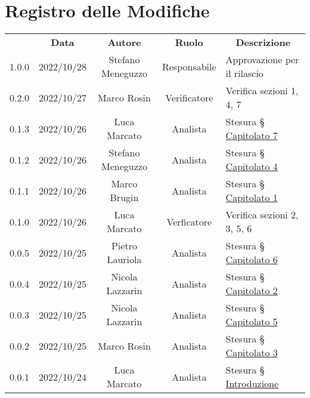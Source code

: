 \thispagestyle{empty}

\section*{Registro delle Modifiche}

\begin{center}
    \renewcommand{\arraystretch}{1.8}
    \begin{longtable}[c]{c | c | c | c | p{5cm}}
        \rowcolor[HTML]{444444}
        \multicolumn{1}{c}{\color[HTML]{FFFFFF} \textbf{Versione}} &
        \multicolumn{1}{c}{\color[HTML]{FFFFFF} \textbf{Data}}     &
        \multicolumn{1}{c}{\color[HTML]{FFFFFF} \textbf{Autore}}   &
        \multicolumn{1}{c}{\color[HTML]{FFFFFF} \textbf{Ruolo}}    &
        \multicolumn{1}{c}{\color[HTML]{FFFFFF} \textbf{Descrizione}}                                                                                                             \\

        1.0.0 & 2022/10/28 & Stefano Meneguzzo  & Responsabile  & Approvazione per il rilascio                            \\ \hline
        0.2.0 & 2022/10/27 & Marco Rosin        & Verificatore  & Verifica sezioni 1, 4, 7                                \\ \hline
        0.1.3 & 2022/10/26 & Luca Marcato       & Analista      & Stesura § \hyperref[section:c7]{Capitolato 7}           \\ \hline
        0.1.2 & 2022/10/26 & Stefano Meneguzzo  & Analista      & Stesura § \hyperref[section:c4]{Capitolato 4}           \\ \hline
        0.1.1 & 2022/10/26 & Marco Brugin       & Analista      & Stesura § \hyperref[section:c1]{Capitolato 1}           \\ \hline
        0.1.0 & 2022/10/26 & Luca Marcato       & Verficatore   & Verifica sezioni 2, 3, 5, 6                             \\ \hline
        0.0.5 & 2022/10/25 & Pietro Lauriola    & Analista      & Stesura § \hyperref[section:c6]{Capitolato 6}           \\ \hline
        0.0.4 & 2022/10/25 & Nicola Lazzarin    & Analista      & Stesura § \hyperref[section:c2]{Capitolato 2}           \\ \hline
        0.0.3 & 2022/10/25 & Nicola Lazzarin    & Analista      & Stesura § \hyperref[section:c5]{Capitolato 5}           \\ \hline
        0.0.2 & 2022/10/25 & Marco Rosin        & Analista      & Stesura § \hyperref[section:c3]{Capitolato 3}           \\ \hline
        0.0.1 & 2022/10/24 & Luca Marcato       & Analista      & Stesura § \hyperref[section:introduzione]{Introduzione} \\
    \end{longtable}
\end{center}